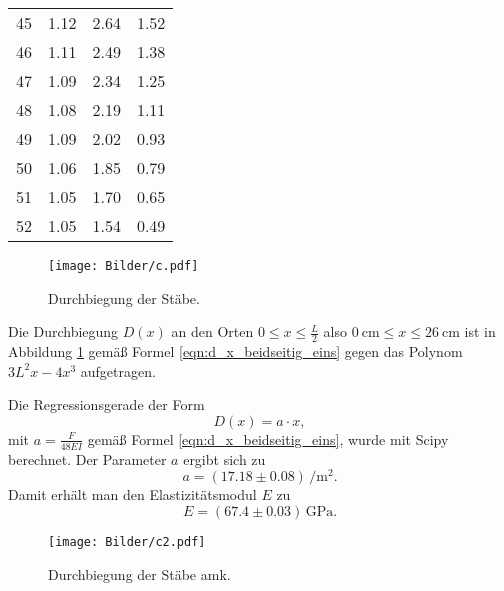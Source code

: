 \begin{longtable}[c]{cccc}
	45                        & 1.12                           & 2.64                                      & 1.52                         \\
	46                        & 1.11                           & 2.49                                      & 1.38                         \\
	47                        & 1.09                           & 2.34                                      & 1.25                         \\
	48                        & 1.08                           & 2.19                                      & 1.11                         \\
	49                        & 1.09                           & 2.02                                      & 0.93                         \\
	50                        & 1.06                           & 1.85                                      & 0.79                         \\
	51                        & 1.05                           & 1.70                                      & 0.65                         \\
	52                        & 1.05                           & 1.54                                      & 0.49                         \\
\end{longtable}

\begin{figure}
	\centering
	\texttt{[image: Bilder/c.pdf]}
	\caption{Durchbiegung der Stäbe.}
	\label{fig:Stabus}
\end{figure}

Die Durchbiegung $D(x)$ an den Orten $0 \leq x \leq \frac{L}{2}$
also $\SI{0}{\centi\meter} \leq x \leq \SI{26}{\centi\meter}$
ist in Abbildung \ref{fig:Stabus} gemäß Formel \eqref{eqn:d_x_beidseitig_eins} gegen das
Polynom $3L^2x - 4x^3$ aufgetragen.

Die Regressionsgerade der Form
\begin{equation*}
	D(x) = a \cdot x \mathrm{,}
\end{equation*}
mit $a = \frac{F}{48EI}$ gemäß Formel \eqref{eqn:d_x_beidseitig_eins}, wurde mit Scipy
\cite{scipy} berechnet.
Der Parameter $a$ ergibt sich zu
\begin{equation*}
	a = (17.18 \pm 0.08) \,\si{\per\square\meter} \mathrm{.}
\end{equation*}
Damit erhält man den Elastizitätsmodul $E$ zu
\begin{equation*}
	E = (67.4 \pm 0.03) \, \si{\giga\pascal} \mathrm{.}
\end{equation*}
\begin{figure}
	\centering
	\texttt{[image: Bilder/c2.pdf]}
	\caption{Durchbiegung der Stäbe amk.}
	\label{fig:StabusMaximus}
\end{figure}

